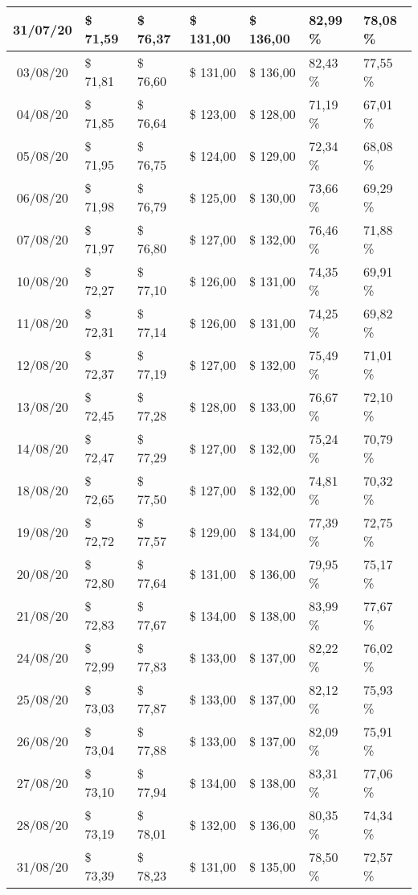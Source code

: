 \begin{center}
\begin{longtable}{|c|p{1.5cm}|p{1.5cm}|p{1.5cm}|p{1.5cm}|p{1.5cm}|p{1.5cm}|}
31/07/20 & \$ 71,59 & \$ 76,37 & \$ 131,00 & \$ 136,00 & 82,99 \% & 78,08 \% \\ \hline
03/08/20 & \$ 71,81 & \$ 76,60 & \$ 131,00 & \$ 136,00 & 82,43 \% & 77,55 \% \\ \hline
04/08/20 & \$ 71,85 & \$ 76,64 & \$ 123,00 & \$ 128,00 & 71,19 \% & 67,01 \% \\ \hline
05/08/20 & \$ 71,95 & \$ 76,75 & \$ 124,00 & \$ 129,00 & 72,34 \% & 68,08 \% \\ \hline
06/08/20 & \$ 71,98 & \$ 76,79 & \$ 125,00 & \$ 130,00 & 73,66 \% & 69,29 \% \\ \hline
07/08/20 & \$ 71,97 & \$ 76,80 & \$ 127,00 & \$ 132,00 & 76,46 \% & 71,88 \% \\ \hline
10/08/20 & \$ 72,27 & \$ 77,10 & \$ 126,00 & \$ 131,00 & 74,35 \% & 69,91 \% \\ \hline
11/08/20 & \$ 72,31 & \$ 77,14 & \$ 126,00 & \$ 131,00 & 74,25 \% & 69,82 \% \\ \hline
12/08/20 & \$ 72,37 & \$ 77,19 & \$ 127,00 & \$ 132,00 & 75,49 \% & 71,01 \% \\ \hline
13/08/20 & \$ 72,45 & \$ 77,28 & \$ 128,00 & \$ 133,00 & 76,67 \% & 72,10 \% \\ \hline
14/08/20 & \$ 72,47 & \$ 77,29 & \$ 127,00 & \$ 132,00 & 75,24 \% & 70,79 \% \\ \hline
18/08/20 & \$ 72,65 & \$ 77,50 & \$ 127,00 & \$ 132,00 & 74,81 \% & 70,32 \% \\ \hline
19/08/20 & \$ 72,72 & \$ 77,57 & \$ 129,00 & \$ 134,00 & 77,39 \% & 72,75 \% \\ \hline
20/08/20 & \$ 72,80 & \$ 77,64 & \$ 131,00 & \$ 136,00 & 79,95 \% & 75,17 \% \\ \hline
21/08/20 & \$ 72,83 & \$ 77,67 & \$ 134,00 & \$ 138,00 & 83,99 \% & 77,67 \% \\ \hline
24/08/20 & \$ 72,99 & \$ 77,83 & \$ 133,00 & \$ 137,00 & 82,22 \% & 76,02 \% \\ \hline
25/08/20 & \$ 73,03 & \$ 77,87 & \$ 133,00 & \$ 137,00 & 82,12 \% & 75,93 \% \\ \hline
26/08/20 & \$ 73,04 & \$ 77,88 & \$ 133,00 & \$ 137,00 & 82,09 \% & 75,91 \% \\ \hline
27/08/20 & \$ 73,10 & \$ 77,94 & \$ 134,00 & \$ 138,00 & 83,31 \% & 77,06 \% \\ \hline
28/08/20 & \$ 73,19 & \$ 78,01 & \$ 132,00 & \$ 136,00 & 80,35 \% & 74,34 \% \\ \hline
31/08/20 & \$ 73,39 & \$ 78,23 & \$ 131,00 & \$ 135,00 & 78,50 \% & 72,57 \% \\ \hline

\end{longtable}
\end{center}
